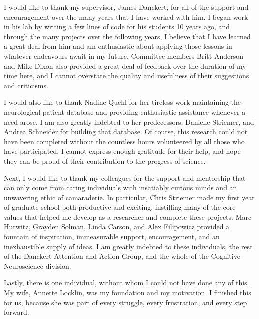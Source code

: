 I would like to thank my supervisor, James Danckert, for all of the support and
encouragement over the many years that I have worked with him. I began work in
his lab by writing a few lines of code for his students 10
years ago, and through the many projects over the following
years, I believe that I have learned a great deal from him and am enthusiastic
about applying those lessons in whatever endeavours await in my future.
Committee members Britt Anderson and Mike Dixon also provided a great deal of
feedback over the duration of my time here, and I cannot
overstate the quality and usefulness of their suggestions and criticisms.

I would also like to thank Nadine Quehl for her tireless work maintaining the
neurological patient database and providing enthusiastic assistance whenever a
need arose. I am also greatly indebted to her predecessors, Danielle Striemer,
and Andrea Schneider for building that database. Of course, this research could
not have been completed without the countless hours volunteered by all those
who have participated. I cannot express enough gratitude for their help, and
hope they can be proud of their contribution to the progress of
science.

Next, I would like to thank my colleagues for the support and mentorship that
can only come from caring individuals with insatiably curious minds and an
unwavering ethic of camaraderie. In particular, Chris Striemer made my first
year of graduate school both productive and exciting, instilling many of the
core values that helped me develop as a researcher and complete these projects.
Marc Hurwitz, Grayden Solman, Linda Carson, and Alex Filipowicz provided a
fountain of inspiration, immeasurable support, encouragement, and an
inexhaustible supply of ideas. I am greatly indebted to these individuals, the
rest of the Danckert Attention and Action Group, and the whole of the Cognitive
Neuroscience division.

Lastly, there is one individual, without whom I could not have done any of
this. My wife, Annette Locklin, was my foundation and my motivation. I finished
this for us, because she was part of every struggle, every frustration, and
every step forward.
